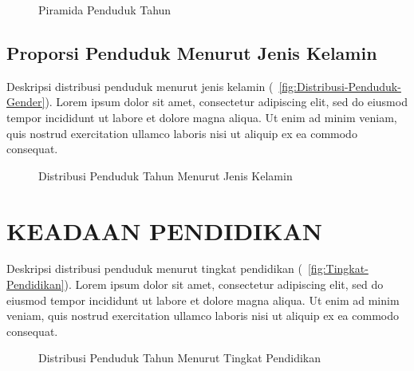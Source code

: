 \begin{figure}[!h]
    \centering{}
    \caption{Piramida Penduduk \namaKabupaten Tahun \tP}
    \label{fig:Piramida-Penduduk-2019}
\end{figure}

\subsection{Proporsi Penduduk Menurut Jenis Kelamin}
Deskripsi distribusi penduduk menurut jenis kelamin (~\autoref{fig:Distribusi-Penduduk-Gender}). Lorem ipsum dolor sit amet, consectetur adipiscing elit, sed do eiusmod tempor incididunt ut labore et dolore magna aliqua. Ut enim ad minim veniam, quis nostrud exercitation ullamco laboris nisi ut aliquip ex ea commodo consequat.

\begin{figure}[!h]
    \centering{}
    \caption{Distribusi Penduduk \namaKabupaten Tahun \tP Menurut Jenis Kelamin}
    \label{fig:Distribusi-Penduduk-Gender}
\end{figure}

\section{KEADAAN PENDIDIKAN}
Deskripsi distribusi penduduk menurut tingkat pendidikan (~\autoref{fig:Tingkat-Pendidikan}). Lorem ipsum dolor sit amet, consectetur adipiscing elit, sed do eiusmod tempor incididunt ut labore et dolore magna aliqua. Ut enim ad minim veniam, quis nostrud exercitation ullamco laboris nisi ut aliquip ex ea commodo consequat.

\begin{figure}[H]
    \centering
    \caption{Distribusi Penduduk \namaKabupaten Tahun \tP Menurut Tingkat Pendidikan}
    \label{fig:Tingkat-Pendidikan}
\end{figure}
